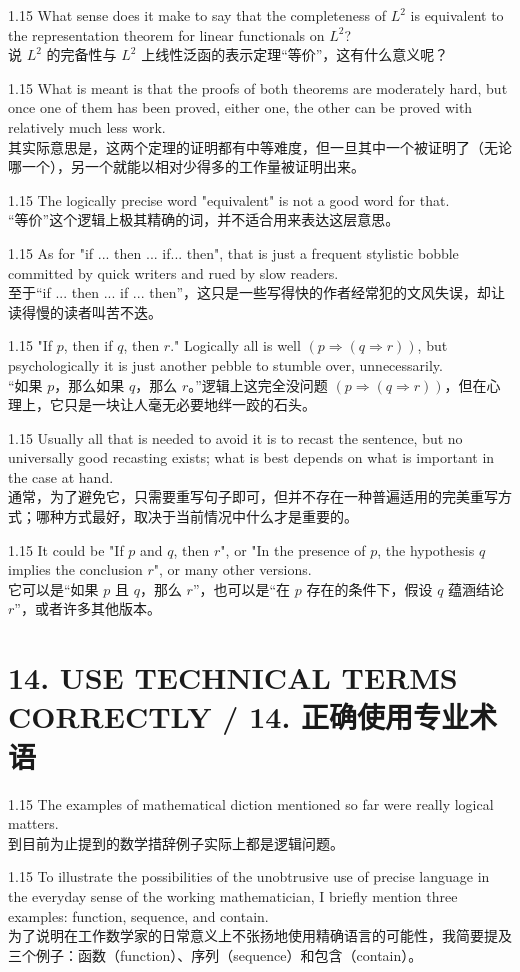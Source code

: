 \documentclass[12pt,a4paper]{article}
\newcommand{\bilingual}[2]{
    \begin{spacing}{1.15} %
        \noindent \normalsize #1 \\[-0.5ex] %
        \small \textcolor{blue!70!black}{#2} %
    \end{spacing}
    \vspace{0.8em} %
}
\begin{document}
\bilingual{What sense does it make to say that the completeness of $L^{2}$ is equivalent to the representation theorem for linear functionals on $L^{2}$?}
{说 $L^{2}$ 的完备性与 $L^{2}$ 上线性泛函的表示定理“等价”，这有什么意义呢？} %

\bilingual{What is meant is that the proofs of both theorems are moderately hard, but once one of them has been proved, either one, the other can be proved with relatively much less work.}
{其实际意思是，这两个定理的证明都有中等难度，但一旦其中一个被证明了（无论哪一个），另一个就能以相对少得多的工作量被证明出来。} %

\bilingual{The logically precise word "equivalent" is not a good word for that.}
{“等价”这个逻辑上极其精确的词，并不适合用来表达这层意思。} %

\bilingual{As for "if ... then ... if... then", that is just a frequent stylistic bobble committed by quick writers and rued by slow readers.}
{至于“if ... then ... if ... then”，这只是一些写得快的作者经常犯的文风失误，却让读得慢的读者叫苦不迭。} %

\bilingual{"If $p$, then if $q$, then $r$." Logically all is well $(p\Rightarrow(q\Rightarrow r))$, but psychologically it is just another pebble to stumble over, unnecessarily.}
{“如果 $p$，那么如果 $q$，那么 $r$。”逻辑上这完全没问题 $(p\Rightarrow(q\Rightarrow r))$，但在心理上，它只是一块让人毫无必要地绊一跤的石头。} %

\bilingual{Usually all that is needed to avoid it is to recast the sentence, but no universally good recasting exists; what is best depends on what is important in the case at hand.}
{通常，为了避免它，只需要重写句子即可，但并不存在一种普遍适用的完美重写方式；哪种方式最好，取决于当前情况中什么才是重要的。} %

\bilingual{It could be "If $p$ and $q$, then $r$", or "In the presence of $p$, the hypothesis $q$ implies the conclusion $r$", or many other versions.}
{它可以是“如果 $p$ 且 $q$，那么 $r$”，也可以是“在 $p$ 存在的条件下，假设 $q$ 蕴涵结论 $r$”，或者许多其他版本。} %

\section*{14. USE TECHNICAL TERMS CORRECTLY / 14. 正确使用专业术语} %

\bilingual{The examples of mathematical diction mentioned so far were really logical matters.}
{到目前为止提到的数学措辞例子实际上都是逻辑问题。} %

\bilingual{To illustrate the possibilities of the unobtrusive use of precise language in the everyday sense of the working mathematician, I briefly mention three examples: function, sequence, and contain.}
{为了说明在工作数学家的日常意义上不张扬地使用精确语言的可能性，我简要提及三个例子：函数（function）、序列（sequence）和包含（contain）。} %
\end{document}
